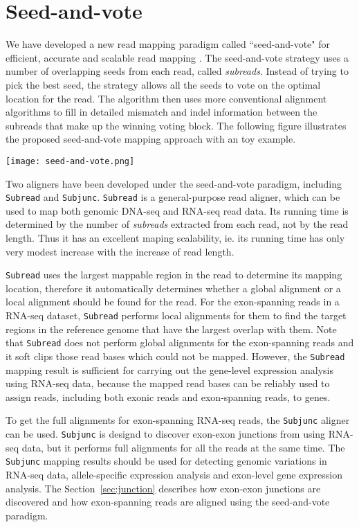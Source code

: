 \documentclass[12pt]{report}
\newcommand{\code}[1]{{\small\texttt{#1}}}
\begin{document}
\section{Seed-and-vote}

We have developed a new read mapping paradigm called ``seed-and-vote" for efficient, accurate and scalable read mapping \cite{liao}.
The seed-and-vote strategy uses a number of overlapping seeds from each read, called \emph{subreads}.
Instead of trying to pick the best seed, the strategy allows all the seeds to vote on the optimal location for the read.
The algorithm then uses more conventional alignment algorithms to fill in detailed mismatch and indel information between the subreads that make up the winning voting block. 
The following figure illustrates the proposed seed-and-vote mapping approach with an toy example.

\begin{center}
\texttt{[image: seed-and-vote.png]}
\end{center}

Two aligners have been developed under the seed-and-vote paradigm, including \code{Subread} and \code{Subjunc}.
\code{Subread} is a general-purpose read aligner, which can be used to map both genomic DNA-seq and RNA-seq read data.
Its running time is determined by the number of \emph{subreads} extracted from each read, not by the read length.
Thus it has an excellent maping scalability, ie. its running time has only very modest increase with the increase of read length.

\code{Subread} uses the largest mappable region in the read to determine its mapping location, therefore it automatically determines whether a global alignment or a local alignment should be found for the read.
For the exon-spanning reads in a RNA-seq dataset, \code{Subread} performs local alignments for them to find the target regions in the reference genome that have the largest overlap with them.
Note that \code{Subread} does not perform global alignments for the exon-spanning reads and it soft clips those read bases which could not be mapped.
However, the \code{Subread} mapping result is sufficient for carrying out the gene-level expression analysis using RNA-seq data, because the mapped read bases can be reliably used to assign reads, including both exonic reads and exon-spanning reads, to genes.

To get the full alignments for exon-spanning RNA-seq reads, the \code{Subjunc} aligner can be used.
\code{Subjunc} is designd to discover exon-exon junctions from using RNA-seq data, but it performs full alignments for all the reads at the same time. 
The \code{Subjunc} mapping results should be used for detecting genomic variations in RNA-seq data, allele-specific expression analysis and exon-level gene expression analysis.
The Section~\ref{sec:junction} describes how exon-exon junctions are discovered and how exon-spanning reads are aligned using the seed-and-vote paradigm.
\end{document}
